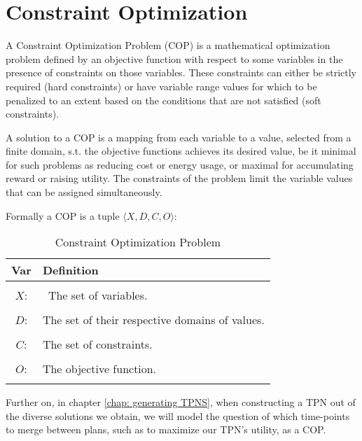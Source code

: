 \section{Constraint Optimization}
\label{background: COP}
A Constraint Optimization Problem (COP) is a mathematical optimization problem defined by an objective function with respect to some variables in the presence of constraints on those variables. 
These constraints can either be strictly required (hard constraints) or have variable range values for which to be penalized to an extent based on the conditions that are not satisfied (soft constraints).

A solution to a COP is a mapping from each variable to a value, selected from a finite domain, s.t. the objective functions achieves its desired value, be it minimal for such problems as reducing cost or energy usage, or maximal for accumulating reward or raising utility.
The constraints of the problem limit the variable values that can be assigned simultaneously.

Formally a COP is a tuple $\langle X,D,C,O\rangle$: 
\begin{table}[ht!]
\centering
\begin{tabularx}{\textwidth}{ c  X }

\textbf{Var}  & \textbf{Definition} \\
\hline
\\
$X$:     & \ {The set of variables.}  \\
\\
$D$:     & {The set of their respective domains of values. }       \\
\\
$C$:     & {The set of constraints.}      \\
\\
$O$:     & {The objective function.}      \\
\\

\end{tabularx}
\caption{Constraint Optimization Problem}
\label{tab:COP}
\end{table}


Further on, in chapter \ref{chap: generating TPNS},  when constructing a TPN out of the diverse solutions we obtain, we will model the question of which time-points to merge between plans, such as to maximize our TPN's utility, as a COP.

